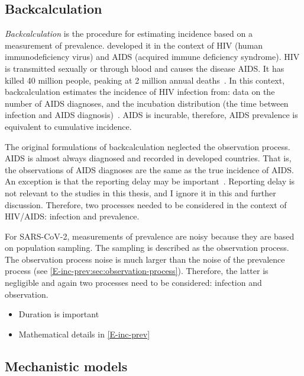 \documentclass[thesis.tex]{subfiles}
\begin{document}
\subsection{Backcalculation}

\emph{Backcalculation} is the procedure for estimating incidence based on a measurement of prevalence.
\Textcite{brookmeyerMethod} developed it in the context of HIV (human immunodeficiency virus) and AIDS (acquired immune deficiency syndrome).
HIV is transmitted sexually or through blood and causes the disease AIDS.
It has killed 40 million people, peaking at 2 million annual deaths~\autocite{unaids2023}.
In this context, backcalculation estimates the incidence of HIV infection from: data on the number of AIDS diagnoses, and the incubation distribution (the time between infection and AIDS diagnosis)~\autocites{brookmeyerBackcalculation}{brookmeyerMeasuring}.
AIDS is incurable, therefore, AIDS prevalence is equivalent to cumulative incidence.


The original formulations of backcalculation neglected the observation process.
AIDS is almost always diagnosed and recorded in developed countries.
That is, the observations of AIDS diagnoses are the same as the true incidence of AIDS.
An exception is that the reporting delay may be important~\autocite{paganoHIV}.
Reporting delay is not relevant to the studies in this thesis, and I ignore it in this and further discussion.
Therefore, two processes needed to be considered in the context of HIV/AIDS: infection and prevalence.

For SARS-CoV-2, measurements of prevalence are noisy because they are based on population sampling.
The sampling is described as the observation process.
The observation process noise is much larger than the noise of the prevalence process (see \cref{E-inc-prev:sec:observation-process}).
Therefore, the latter is negligible and again two processes need to be considered: infection and observation.

\begin{itemize}
    \item Duration is important
    \item Mathematical details in \cref{E-inc-prev}
\end{itemize}

\subsection{Mechanistic models}
\end{document}

